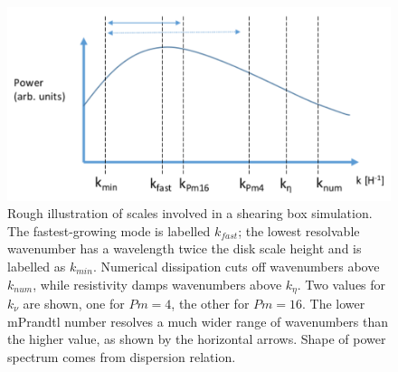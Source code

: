 %
\begin{figure}[h]
  \begin{center}  
    \includegraphics [width=.9\textwidth, angle=0.]{img/kscales.pdf}
  \end{center}
  \caption{Rough illustration of scales involved in a shearing box simulation. The fastest-growing mode is labelled $k_{fast}$; the lowest resolvable wavenumber has a wavelength twice the disk scale height and is labelled as $k_{min}$. Numerical dissipation cuts off wavenumbers above $k_{num}$, while resistivity damps wavenumbers above $k_\eta$. Two values for $k_\nu$ are shown, one for $Pm=4$, the other for $Pm=16$. The lower mPrandtl number resolves a much wider range of wavenumbers than the higher value, as shown by the horizontal arrows. Shape of power spectrum comes from dispersion relation. }
  \label{fig:scales}
\end{figure}
